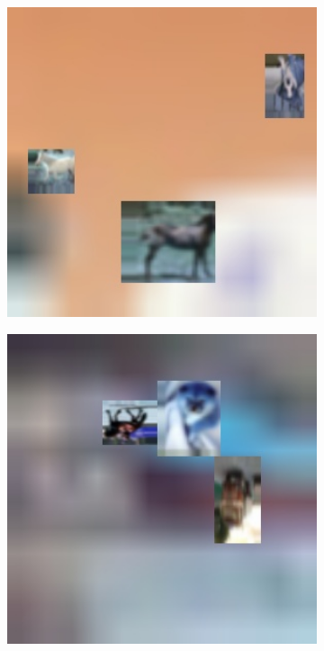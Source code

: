 \begin{figure}[]
	\begin{center}
		\begin{subfigure}{.3\textwidth}
			\includegraphics[width=1\textwidth]{img/cifar-zsd-test400.jpg}
			\label{fig:ex1}
		\end{subfigure}
		\begin{subfigure}{.3\textwidth}
			\includegraphics[width=1\textwidth]{img/cifar-zsd-test379.jpg}

\end{subfigure}
\end{center}
\end{figure}

